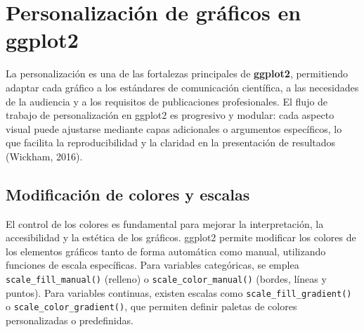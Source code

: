 \documentclass[
  spanish,
  a4paper,
  DIV=11,
  numbers=noendperiod,
  onepage,
  openany]{scrreprt}
\begin{document}
\section{Personalización de gráficos en
ggplot2}\label{personalizaciuxf3n-de-gruxe1ficos-en-ggplot2}

La personalización es una de las fortalezas principales de
\textbf{ggplot2}, permitiendo adaptar cada gráfico a los estándares de
comunicación científica, a las necesidades de la audiencia y a los
requisitos de publicaciones profesionales. El flujo de trabajo de
personalización en ggplot2 es progresivo y modular: cada aspecto visual
puede ajustarse mediante capas adicionales o argumentos específicos, lo
que facilita la reproducibilidad y la claridad en la presentación de
resultados (Wickham, 2016).

\subsection{Modificación de colores y
escalas}\label{modificaciuxf3n-de-colores-y-escalas}

El control de los colores es fundamental para mejorar la interpretación,
la accesibilidad y la estética de los gráficos. ggplot2 permite
modificar los colores de los elementos gráficos tanto de forma
automática como manual, utilizando funciones de escala específicas. Para
variables categóricas, se emplea \texttt{scale\_fill\_manual()}
(relleno) o \texttt{scale\_color\_manual()} (bordes, líneas y puntos).
Para variables continuas, existen escalas como
\texttt{scale\_fill\_gradient()} o \texttt{scale\_color\_gradient()},
que permiten definir paletas de colores personalizadas o predefinidas.
\end{document}
